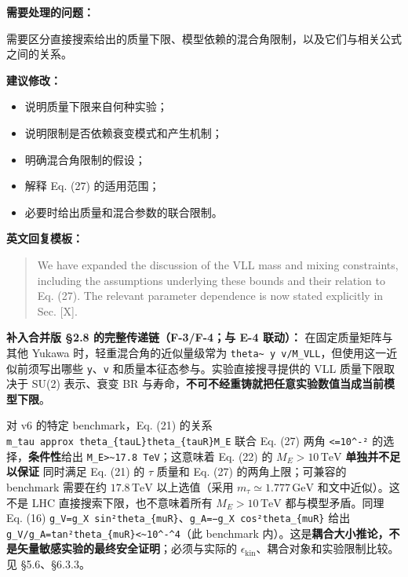 \documentclass[
  chinese,
  UTF8]{ctexart}
\providecommand{\tightlist}{%
  \setlength{\itemsep}{0pt}\setlength{\parskip}{0pt}}
\begin{document}
\textbf{需要处理的问题：}

需要区分直接搜索给出的质量下限、模型依赖的混合角限制，以及它们与相关公式之间的关系。

\textbf{建议修改：}

\begin{itemize}
\tightlist
\item
  说明质量下限来自何种实验；
\item
  说明限制是否依赖衰变模式和产生机制；
\item
  明确混合角限制的假设；
\item
  解释 Eq. (27) 的适用范围；
\item
  必要时给出质量和混合参数的联合限制。
\end{itemize}

\textbf{英文回复模板：}

\begin{quote}
We have expanded the discussion of the VLL mass and mixing constraints,
including the assumptions underlying these bounds and their relation to
Eq. (27). The relevant parameter dependence is now stated explicitly in
Sec. {[}X{]}.
\end{quote}

\textbf{补入合并版 §2.8 的完整传递链（F-3/F-4；与 E-4 联动）：}
在固定质量矩阵与其他 Yukawa 时，轻重混合角的近似量级常为
\texttt{theta\textasciitilde{}\ y\ v/M\_VLL}，但使用这一近似前须写出哪些
\texttt{y}、\texttt{v} 和质量本征态参与。实验直接搜寻提供的 VLL
质量下限取决于 SU(2) 表示、衰变 BR
与寿命，\textbf{不可不经重铸就把任意实验数值当成当前模型下限}。

对 v6 的特定 benchmark，Eq. (21) 的关系
\texttt{m\_tau\ approx\ theta\_\{tauL\}theta\_\{tauR\}M\_E} 联合 Eq.
(27) 两角 \texttt{\textless{}=10\^{}-²} 的选择，\textbf{条件性}给出
\texttt{M\_E\textgreater{}\textasciitilde{}17.8\ TeV}；这意味着 Eq. (22)
的 \(M_E>10\,\mathrm{TeV}\) \textbf{单独并不足以保证} 同时满足 Eq. (21)
的 \(\tau\) 质量和 Eq. (27) 的两角上限；可兼容的 benchmark 需要在约
\(17.8\,\mathrm{TeV}\) 以上选值（采用
\(m_\tau\simeq1.777\,\mathrm{GeV}\) 和文中近似）。这不是 LHC
直接搜索下限，也不意味着所有 \(M_E>10\,\mathrm{TeV}\) 都与模型矛盾。同理
Eq. (16)
\texttt{g\_V=g\_X\ sin²theta\_\{muR\}}、\texttt{g\_A=−g\_X\ cos²theta\_\{muR\}}
给出
\texttt{\textbar{}g\_V/g\_A\textbar{}=tan²theta\_\{muR\}\textless{}\textasciitilde{}10\^{}-\^{}4}（此
benchmark
内）。这是\textbf{耦合大小推论，不是矢量敏感实验的最终安全证明}；必须与实际的
\(\epsilon_{\mathrm{kin}}\)、耦合对象和实验限制比较。见 §5.6、§6.3.3。
\end{document}
